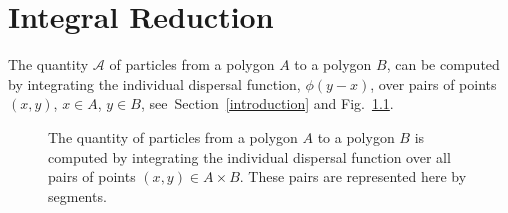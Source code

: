 
\chapter{Integral Reduction}
\label{sec:reduction:dimension}

The quantity  $\mathcal{A}$ of particles from a polygon $A$
to a polygon $B$,  can be computed
by integrating the individual dispersal function, $\phi(y-x)$,
over pairs  of points $(x,y)$, $x\in A$, $y\in B$,
see~Section~\ref{introduction} and Fig.~\ref{fig:int:geom:1}.

\begin{figure}[htbp]
  \caption{The quantity of particles from a polygon $A$
to a polygon $B$ is computed
by integrating the individual dispersal function
over all pairs of points $(x,y) \in A\times B$.
These pairs are represented here by segments.}
    \label{fig:int:geom:1}
\end{figure}

